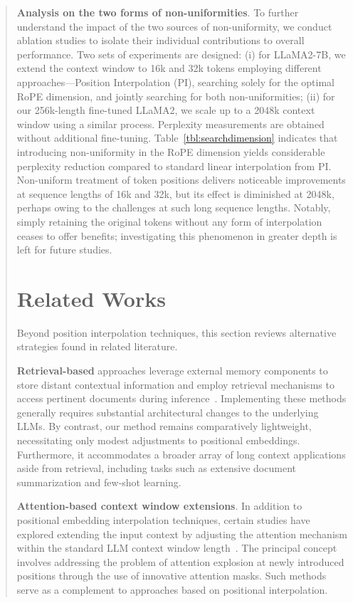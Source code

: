 \begin{abstract}
\textbf{Analysis on the two forms of non-uniformities}. To further understand the impact of the two sources of non-uniformity, we conduct ablation studies to isolate their individual contributions to overall performance. Two sets of experiments are designed: (i) for LLaMA2-7B, we extend the context window to 16k and 32k tokens employing different approaches—Position Interpolation (PI), searching solely for the optimal RoPE dimension, and jointly searching for both non-uniformities; (ii) for our 256k-length fine-tuned LLaMA2, we scale up to a 2048k context window using a similar process. Perplexity measurements are obtained without additional fine-tuning. Table~\ref{tbl:searchdimension} indicates that introducing non-uniformity in the RoPE dimension yields considerable perplexity reduction compared to standard linear interpolation from PI. Non-uniform treatment of token positions delivers noticeable improvements at sequence lengths of 16k and 32k, but its effect is diminished at 2048k, perhaps owing to the challenges at such long sequence lengths. Notably, simply retaining the original tokens without any form of interpolation ceases to offer benefits; investigating this phenomenon in greater depth is left for future studies.

\section{Related Works}

Beyond position interpolation techniques, this section reviews alternative strategies found in related literature.

\textbf{Retrieval-based} approaches leverage external memory components to store distant contextual information and employ retrieval mechanisms to access pertinent documents during inference~\cite{longllama,wang2023augmenting,borgeaud2022improving}. Implementing these methods generally requires substantial architectural changes to the underlying LLMs. By contrast, our method remains comparatively lightweight, necessitating only modest adjustments to positional embeddings. Furthermore, it accommodates a broader array of long context applications aside from retrieval, including tasks such as extensive document summarization and few-shot learning.

\textbf{Attention-based context window extensions}. In addition to positional embedding interpolation techniques, certain studies have explored extending the input context by adjusting the attention mechanism within the standard LLM context window length~\cite{han2023lminfinite, streamingllm,parallelwindow}. The principal concept involves addressing the problem of attention explosion at newly introduced positions through the use of innovative attention masks. Such methods serve as a complement to approaches based on positional interpolation.


\end{abstract}
